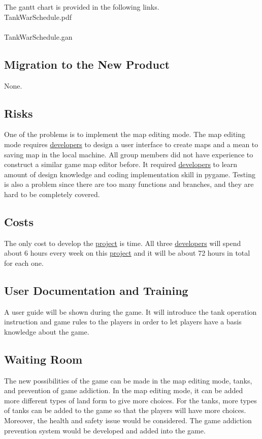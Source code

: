 \documentclass[12pt, titlepage]{article}
\begin{document}
The gantt chart is provided in the following links.\\
TankWarSchedule.pdf\\
\\
TankWarSchedule.gan\\

\subsection{Migration to the New Product}
None.
\subsection{Risks}
One of the problems is to implement the map editing mode. The map editing mode requires \underline{developers} to design a user interface to create maps and a mean to saving map in the local machine. All group members did not have experience to construct a similar game map editor before. It required \underline{developers} to learn amount of design knowledge and coding implementation skill in pygame. Testing is also a problem since there are too many functions and branches, and they are hard to be completely covered.
\subsection{Costs}
The only cost to develop the \underline{project} is time. All three \underline{developers} will spend about 6 hours every week on this \underline{project} and it will be about 72 hours in total for each one.
\subsection{User Documentation and Training}
A user guide will be shown during the game. It will introduce the tank operation instruction and game rules to the players in order to let players have a basis knowledge about the game.
\subsection{Waiting Room}
The new possibilities of the game can be made in the map editing mode, tanks, and prevention of game addiction. In the map editing mode, it can be added more different types of land form to give more choices. For the tanks, more types of tanks can be added to the game so that the players will have more choices. Moreover, the health and safety issue would be considered. The game addiction prevention system would be developed and added into the game.
\end{document}
